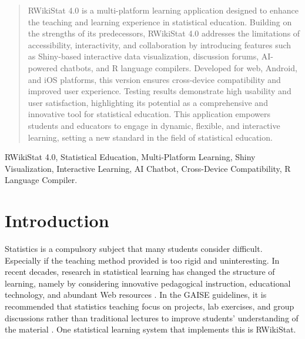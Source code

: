 \documentclass[conference,a4paper]{IEEEtran}
\begin{document}
\maketitle

\begin{abstract}
  RWikiStat 4.0 is a multi-platform learning application designed to enhance the teaching and learning experience in statistical education. Building on the strengths of its predecessors, RWikiStat 4.0 addresses the limitations of accessibility, interactivity, and collaboration by introducing features such as Shiny-based interactive data visualization, discussion forums, AI-powered chatbots, and R language compilers. Developed for web, Android, and iOS platforms, this version ensures cross-device compatibility and improved user experience. Testing results demonstrate high usability and user satisfaction, highlighting its potential as a comprehensive and innovative tool for statistical education. This application empowers students and educators to engage in dynamic, flexible, and interactive learning, setting a new standard in the field of statistical education.
\end{abstract}

\begin{IEEEkeywords}
  RWikiStat 4.0, Statistical Education, Multi-Platform Learning, Shiny Visualization, Interactive Learning, AI Chatbot, Cross-Device Compatibility, R Language Compiler.
\end{IEEEkeywords}

\section{Introduction}
\label{sect:introduction}

Statistics is a compulsory subject that many students consider difficult.
Especially if the teaching method provided is too rigid and uninteresting. In
recent decades, research in statistical learning has changed the structure of
learning, namely by considering innovative pedagogical instruction, educational
technology, and abundant Web resources \cite{b1}. In the GAISE guidelines, it
is recommended that statistics teaching focus on projects, lab exercises, and
group discussions rather than traditional lectures to improve students'
understanding of the material \cite{b2}. One statistical learning system that
implements this is RWikiStat.
\end{document}
